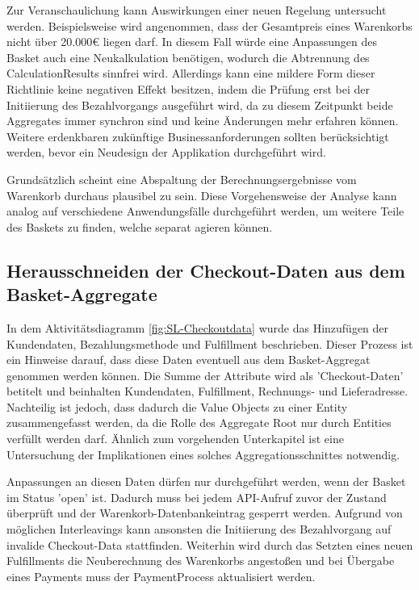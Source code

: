 Zur Veranschaulichung kann Auswirkungen einer neuen Regelung untersucht werden. Beispielsweise wird angenommen, dass der Gesamtpreis eines Warenkorbs nicht über 20.000€ liegen darf. In diesem Fall würde eine Anpassungen des Basket auch eine Neukalkulation benötigen, wodurch die Abtrennung des CalculationResults sinnfrei wird. Allerdings kann eine mildere Form dieser Richtlinie keine negativen Effekt besitzen, indem die Prüfung erst bei der Initiierung des Bezahlvorgangs ausgeführt wird, da zu diesem Zeitpunkt beide Aggregates immer synchron sind und keine Änderungen mehr erfahren können. Weitere erdenkbaren zukünftige Businessanforderungen sollten berücksichtigt werden, bevor ein Neudesign der Applikation durchgeführt wird.

Grundsätzlich scheint eine Abspaltung der Berechnungsergebnisse vom Warenkorb durchaus plausibel zu sein. Diese Vorgehensweise der Analyse kann analog auf verschiedene Anwendungsfälle durchgeführt werden, um weitere Teile des Baskets zu finden, welche separat agieren können. 

\subsection{Herausschneiden der Checkout-Daten aus dem Basket-Aggregate}

In dem Aktivitätsdiagramm \ref{fig:SL-Checkoutdata} wurde das Hinzufügen der Kundendaten, Bezahlungsmethode und Fulfillment beschrieben. Dieser Prozess ist ein Hinweise darauf, dass diese Daten eventuell aus dem Basket-Aggregat genommen werden können. Die Summe der Attribute wird als 'Checkout-Daten' betitelt und beinhalten Kundendaten, Fulfillment, Rechnungs- und Lieferadresse. Nachteilig ist jedoch, dass dadurch die Value Objects zu einer Entity zusammengefasst werden, da die Rolle des Aggregate Root nur durch Entities verfüllt werden darf. Ähnlich zum vorgehenden Unterkapitel ist eine Untersuchung der Implikationen eines solches Aggregationsschnittes notwendig.

Anpassungen an diesen Daten dürfen nur durchgeführt werden, wenn der Basket im Status 'open' ist. Dadurch muss bei jedem API-Aufruf zuvor der Zustand überprüft und der Warenkorb-Datenbankeintrag gesperrt werden. Aufgrund von möglichen Interleavings kann ansonsten die Initiierung des Bezahlvorgang auf invalide Checkout-Data stattfinden. Weiterhin wird durch das Setzten eines neuen Fulfillments die Neuberechnung des Warenkorbs angestoßen und bei Übergabe eines Payments muss der PaymentProcess aktualisiert werden.

